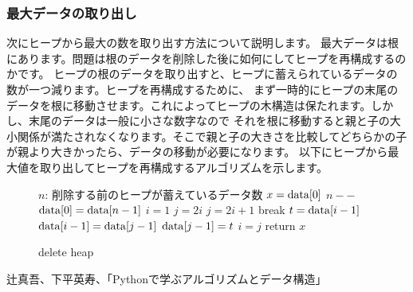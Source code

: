 \documentclass[dvipdfmx,pic,eepic,ecltree]{jarticle}
\begin{document}
\subsubsection{最大データの取り出し}
次にヒープから最大の数を取り出す方法について説明します。
最大データは根にあります。問題は根のデータを削除した後に如何にしてヒープを再構成するのかです。
ヒープの根のデータを取り出すと、ヒープに蓄えられているデータの数が一つ減ります。ヒープを再構成するために、
まず一時的にヒープの末尾のデータを根に移動させます。これによってヒープの木構造は保たれます。しかし、末尾のデータは一般に小さな数字なので
それを根に移動すると親と子の大小関係が満たされなくなります。そこで親と子の大きさを比較してどちらかの子が親より大きかったら、データの移動が必要になります。
以下にヒープから最大値を取り出してヒープを再構成するアルゴリズムを示します。
\begin{figure}[H]
\begin{algorithm}[H]
	\caption{delete heap}
	\label{delete heap}
	\begin{algorithmic}[1]
	\STATE $n$: 削除する前のヒープが蓄えているデータ数
	\STATE $x={\rm data}[0]$
	\STATE $n--$
	\STATE ${\rm data}[0]={\rm data}[n-1]$
	\STATE $i=1$
	\STATE $j=2i$
	\STATE $j=2i+1$
	\ENDIF
	\STATE break
	\ELSE
	\STATE $t={\rm data}[i-1]$
	\STATE ${\rm data}[i-1]={\rm data}[j-1]$
	\STATE ${\rm data}[j-1]=t$
	\ENDIF
	\STATE $i=j$
	\ENDWHILE
	\STATE return $x$
	\end{algorithmic}
\end{algorithm}
\end{figure}


\begin{thebibliography}{9}
\item 辻真吾、下平英寿、「Pythonで学ぶアルゴリズムとデータ構造」
\end{thebibliography}
\end{document}
